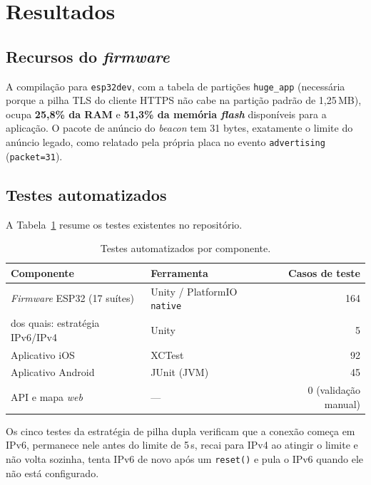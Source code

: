 \documentclass[12pt]{article}
\begin{document}
\section{Resultados}
\label{sec:resultados}

\subsection{Recursos do \textit{firmware}}
A compilação para \texttt{esp32dev}, com a tabela de partições \texttt{huge\_app} (necessária
porque a pilha TLS do cliente HTTPS não cabe na partição padrão de 1,25\,MB), ocupa
\textbf{25,8\% da RAM} e \textbf{51,3\% da memória \textit{flash}} disponíveis para a aplicação. O
pacote de anúncio do \textit{beacon} tem 31 bytes, exatamente o limite do anúncio legado, como
relatado pela própria placa no evento \texttt{advertising} (\texttt{packet=31}).

\subsection{Testes automatizados}
A Tabela~\ref{tab:testes} resume os testes existentes no repositório.

\begin{table}[htb]
\centering
\caption{Testes automatizados por componente.}
\label{tab:testes}
\small
\begin{tabular}{llr}
\toprule
\textbf{Componente} & \textbf{Ferramenta} & \textbf{Casos de teste} \\
\midrule
\textit{Firmware} ESP32 (17 suítes) & Unity / PlatformIO \texttt{native} & 164 \\
\quad dos quais: estratégia IPv6/IPv4 & Unity & 5 \\
Aplicativo iOS & XCTest & 92 \\
Aplicativo Android & JUnit (JVM) & 45 \\
API e mapa \textit{web} & --- & 0 (validação manual) \\
\bottomrule
\end{tabular}
\end{table}

Os cinco testes da estratégia de pilha dupla verificam que a conexão começa em IPv6, permanece
nele antes do limite de 5\,s, recai para IPv4 ao atingir o limite e não volta sozinha, tenta IPv6
de novo após um \texttt{reset()} e pula o IPv6 quando ele não está configurado.
\end{document}
